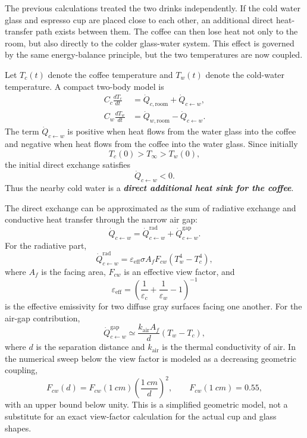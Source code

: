 \documentclass[11pt]{article}
\begin{document}
The previous calculations treated the two drinks independently. If the cold water glass and espresso cup are placed close to each other, an additional direct heat-transfer path exists between them. The coffee can then lose heat not only to the room, but also directly to the colder glass-water system. This effect is governed by the same energy-balance principle, but the two temperatures are now coupled.

Let $T_c(t)$ denote the coffee temperature and $T_w(t)$ denote the cold-water temperature. A compact two-body model is
\begin{align}
    C_c\frac{dT_c}{dt}
    &= \dot Q_{c,\mathrm{room}} + \dot Q_{c\leftarrow w}, \\
    C_w\frac{dT_w}{dt}
    &= \dot Q_{w,\mathrm{room}} - \dot Q_{c\leftarrow w}.
\end{align}
The term $\dot Q_{c\leftarrow w}$ is positive when heat flows from the water glass into the coffee and negative when heat flows from the coffee into the water glass. Since initially
\begin{equation}
    T_c(0)>T_{\infty}>T_w(0),
\end{equation}
the initial direct exchange satisfies
\begin{equation}
    \dot Q_{c\leftarrow w}<0.
\end{equation}
Thus the nearby cold water is a \textbf{\textit{direct additional heat sink for the coffee}}.

The direct exchange can be approximated as the sum of radiative exchange and conductive heat transfer through the narrow air gap:
\begin{equation}
    \dot Q_{c\leftarrow w}
    = \dot Q_{c\leftarrow w}^{\mathrm{rad}}
    + \dot Q_{c\leftarrow w}^{\mathrm{gap}}.
\end{equation}
For the radiative part,
\begin{equation}
    \dot Q_{c\leftarrow w}^{\mathrm{rad}}
    = \varepsilon_{\mathrm{eff}}\sigma A_f F_{cw}
    \left(T_w^4-T_c^4\right),
\end{equation}
where $A_f$ is the facing area, $F_{cw}$ is an effective view factor, and
\begin{equation}
    \varepsilon_{\mathrm{eff}}
    = \left(\frac{1}{\varepsilon_c}+\frac{1}{\varepsilon_w}-1\right)^{-1}
\end{equation}
is the effective emissivity for two diffuse gray surfaces facing one another. For the air-gap contribution,
\begin{equation}
    \dot Q_{c\leftarrow w}^{\mathrm{gap}}
    \simeq \frac{k_{\mathrm{air}}A_f}{d}\left(T_w-T_c\right),
\end{equation}
where $d$ is the separation distance and $k_{\mathrm{air}}$ is the thermal conductivity of air. In the numerical sweep below the view factor is modeled as a decreasing geometric coupling,
\begin{equation}
    F_{cw}(d)=F_{cw}(\SI{1}{cm})\left(\frac{\SI{1}{cm}}{d}\right)^2,
    \qquad F_{cw}(\SI{1}{cm})=0.55,
\end{equation}
with an upper bound below unity. This is a simplified geometric model, not a substitute for an exact view-factor calculation for the actual cup and glass shapes.
\end{document}
